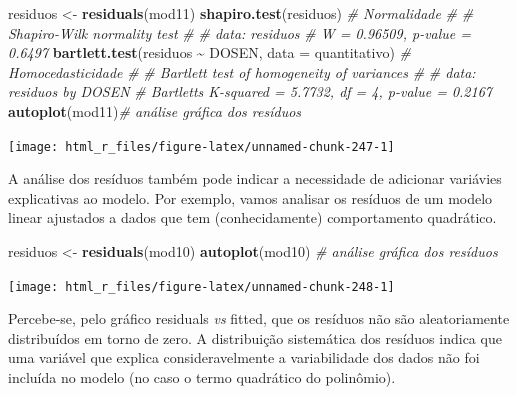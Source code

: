 \documentclass[
]{book}
\newenvironment{Shaded}{\begin{snugshade}}{\end{snugshade}}
\newcommand{\CommentTok}[1]{\textcolor[rgb]{0.56,0.35,0.01}{\textit{#1}}}
\newcommand{\DataTypeTok}[1]{\textcolor[rgb]{0.13,0.29,0.53}{#1}}
\newcommand{\KeywordTok}[1]{\textcolor[rgb]{0.13,0.29,0.53}{\textbf{#1}}}
\newcommand{\NormalTok}[1]{#1}
\newcommand{\OperatorTok}[1]{\textcolor[rgb]{0.81,0.36,0.00}{\textbf{#1}}}
\newcommand{\StringTok}[1]{\textcolor[rgb]{0.31,0.60,0.02}{#1}}
\numberwithin{equation}{section}
\newcommand{\indt}[1]{\index{#1|ST}}
\begin{document}
\begin{Shaded}
\begin{Highlighting}[]

\NormalTok{residuos \textless{}{-}}\StringTok{ }\KeywordTok{residuals}\NormalTok{(mod11)}
\KeywordTok{shapiro.test}\NormalTok{(residuos) }\CommentTok{\# Normalidade}
\CommentTok{\# }
\CommentTok{\#   Shapiro{-}Wilk normality test}
\CommentTok{\# }
\CommentTok{\# data:  residuos}
\CommentTok{\# W = 0.96509, p{-}value = 0.6497}
\KeywordTok{bartlett.test}\NormalTok{(residuos }\OperatorTok{\textasciitilde{}}\StringTok{ }\NormalTok{DOSEN, }\DataTypeTok{data =}\NormalTok{ quantitativo) }\CommentTok{\# Homocedasticidade}
\CommentTok{\# }
\CommentTok{\#   Bartlett test of homogeneity of variances}
\CommentTok{\# }
\CommentTok{\# data:  residuos by DOSEN}
\CommentTok{\# Bartlett\textquotesingle{}s K{-}squared = 5.7732, df = 4, p{-}value = 0.2167}
\KeywordTok{autoplot}\NormalTok{(mod11)}\CommentTok{\# análise gráfica dos resíduos}
\end{Highlighting}
\end{Shaded}

\begin{center}\texttt{[image: html\_r\_files/figure-latex/unnamed-chunk-247-1]} \end{center}

A análise dos resíduos \indt{resíduos} também pode indicar a necessidade de adicionar variávies explicativas ao modelo. Por exemplo, vamos analisar os resíduos de um modelo linear ajustados a dados que tem (conhecidamente) comportamento quadrático.

\begin{Shaded}
\begin{Highlighting}[]
\NormalTok{residuos \textless{}{-}}\StringTok{ }\KeywordTok{residuals}\NormalTok{(mod10)}
\KeywordTok{autoplot}\NormalTok{(mod10) }\CommentTok{\# análise gráfica dos resíduos}
\end{Highlighting}
\end{Shaded}

\begin{center}\texttt{[image: html\_r\_files/figure-latex/unnamed-chunk-248-1]} \end{center}

Percebe-se, pelo gráfico residuals \emph{vs} fitted, que os resíduos não são aleatoriamente distribuídos em torno de zero. A distribuição sistemática dos resíduos indica que uma variável que explica consideravelmente a variabilidade dos dados não foi incluída no modelo (no caso o termo quadrático do polinômio).
\end{document}
